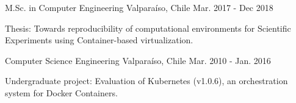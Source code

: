 \begin{cventries}
   {M.Sc. in Computer Engineering}
  {Valparaíso, Chile} {Mar. 2017 - Dec 2018} { \begin{cvitems}\item{Thesis: Towards reproducibility of computational environments for Scientific Experiments using Container-based virtualization.}
  \end{cvitems} }

  {Computer Science Engineering} {Valparaíso, Chile} {Mar. 2010 - Jan. 2016}
  { \begin{cvitems}\item {Undergraduate project: Evaluation of Kubernetes (v1.0.6), an orchestration system for Docker Containers.}\end{cvitems} }
\end{cventries}